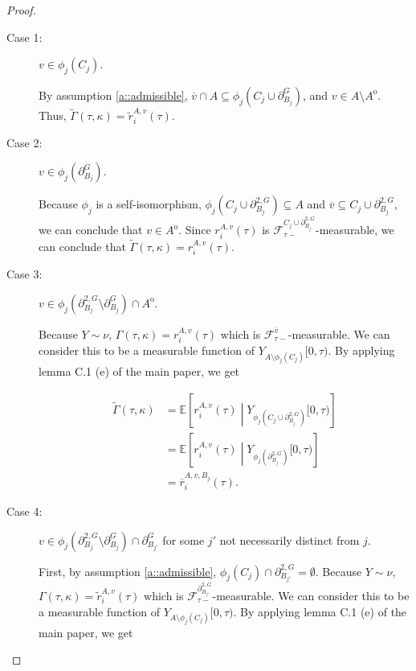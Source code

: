 \documentclass[12pt]{article}
\newcommand{\mb}{\mathbb}
\newcommand{\mc}{\mathcal}
\newcommand{\ov}{\overline}
\newcommand{\ex}[1]{\mb{E}\left[#1\right]}			%
\newcommand{\gneigh}[2]{\partial^{#1}_{#2}}			%
\newcommand{\dgneigh}[2]{\partial^{2,#1}_{#2}}		%
\newcommand{\cl}[1]{\ov{#1}}						%
\newcommand{\rate}{r}								%
\newcommand{\F}{\mc{F}}								%
\newcommand{\vind}[1]{_{#1}}						%
\newcommand{\tme}[1]{(#1)}							%
\newcommand{\tmi}[1]{#1}							%
\newcommand{\vpara}[1]{^{#1}}						%
\newcommand{\stpara}[1]{_{#1}}						%
\newcommand{\tpara}[1]{_{#1}}						%
\newcommand{\gvpara}[2]{^{#1,#2}}					%
\newcommand{\Xg}{Y}									%
\newcommand{\brate}{\alt{\rate}}					%
\newcommand{\inte}[1]{{#1}^\mathrm{o}}				%
\newcommand{\alt}[1]{\tilde{#1}}					%
\newcommand{\rt}{\tau}								%
\renewcommand{\mark}{\kappa}						%
\newcommand{\ratee}{\Gamma}							%
\newcommand{\cratee}{\alt{\ratee}}					%
\newcommand{\mm}{\nu}								%
\newcommand{\bgrate}{\ov{\rate}}					%
\newcommand{\gvjpara}[3]{^{#1,#2,#3}}				%
\begin{document}
\begin{proof}
\begin{description}
\item[Case 1: ] \(v \in \phi_j(C_j)\).

By assumption \ref{a::admissible}, \(\cl{v} \cap A \subseteq \phi_j(C_j\cup \gneigh{G}{B_j})\), and \(v \in A\setminus\inte{A}\). Thus, \(\cratee(\rt,\mark) = \brate\gvpara{A}{v}\stpara{i}(\rt)\).

\item[Case 2: ] \(v\in \phi_j(\gneigh{G}{B_j})\). 

Because \(\phi_j\) is a self-isomorphism, \(\phi_j\left(C_j\cup\dgneigh{G}{B_j}\right) \subseteq A\) and \(\cl{v} \subseteq C_j\cup\dgneigh{G}{B_j}\), we can conclude that \(v \in \inte{A}\). Since \(\rate\gvpara{A}{v}\stpara{i}(\rt)\) is \(\F\vpara{C_j\cup\dgneigh{G}{B_j}}\tpara{\rt-}\)-measurable, we can conclude that \(\cratee(\rt,\mark) = \rate\gvpara{A}{v}\stpara{i}(\rt)\).

\item[Case 3: ] \(v \in \phi_j(\dgneigh{G}{B_j}\setminus\gneigh{G}{B_j})\cap\inte{A}\).

Because \(\Xg\sim\mm\), \(\ratee(\rt,\mark) = \rate\gvpara{A}{v}\stpara{i}(\rt)\) which is \(\F\vpara{\cl{v}}\tpara{\rt-}\)-measurable. We can consider this to be a measurable function of \(\Xg\vind{A\setminus\phi_j(C_j)}\tmi{[0,\rt)}\). By applying lemma C.1 (e) of the main paper, we get

\begin{align*}
\cratee(\rt,\mark) &= \ex{\rate\gvpara{A}{v}\stpara{i}(\rt)\middle|\Xg\vind{\phi_j\left(C_j\cup\dgneigh{G}{B_j}\right)}\tmi{[0,\rt)}}\\
&= \ex{\rate\gvpara{A}{v}\stpara{i}(\rt)\middle|\Xg\vind{\phi_j\left(\dgneigh{G}{B_j}\right)}\tmi{[0,\rt)}}\\
&= \bgrate\gvjpara{A}{v}{B_j}\stpara{i}\tme{\rt}.
\end{align*}

\item[Case 4: ] \(v \in \phi_j(\dgneigh{G}{B_j}\setminus\gneigh{G}{B_j})\cap \gneigh{G}{B_{j'}}\) for some \(j'\) not necessarily distinct from \(j\).

First, by assumption \ref{a::admissible}, \(\phi_j(C_j)\cap\dgneigh{G}{B_{j'}}= \emptyset\). Because \(\Xg\sim\mm\), \(\ratee(\rt,\mark) = \brate\gvpara{A}{v}\stpara{i}(\rt)\) which is \(\F\vpara{\dgneigh{G}{B_{j'}}}\tpara{\rt-}\)-measurable. We can consider this to be a measurable function of \(\Xg\vind{A\setminus\phi_j(C_j)}\tmi{[0,\rt)}\). By applying lemma C.1 (e) of the main paper, we get


\end{description}
\end{proof}
\end{document}
